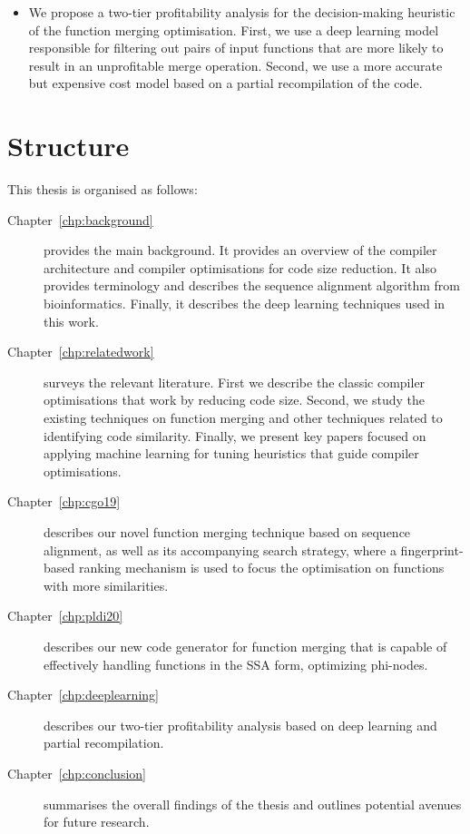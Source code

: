 \begin{itemize}
  \item
  We propose a two-tier profitability analysis for the decision-making heuristic of the function merging optimisation.
  First, we use a deep learning model responsible for filtering out pairs of input functions that are more likely to result in an unprofitable merge operation.
  Second, we use a more accurate but expensive cost model based on a partial recompilation of the code.
\end{itemize}

\section{Structure}

This thesis is organised as follows:
\begin{description}

\item[Chapter~\ref{chp:background}] provides the main background. It provides an overview of the compiler architecture and compiler optimisations for code size reduction.
It also provides terminology and describes the sequence alignment algorithm from bioinformatics.
Finally, it describes the deep learning techniques used in this work.

\item[Chapter~\ref{chp:relatedwork}] surveys the relevant literature. First we describe the classic compiler optimisations that work by reducing code size. Second, we study the existing techniques on function merging and other techniques related to identifying code similarity. Finally, we present key papers focused on applying machine learning for tuning heuristics that guide compiler optimisations.

\item[Chapter~\ref{chp:cgo19}] describes our novel function merging technique based on sequence alignment, as well as its accompanying search strategy, where a fingerprint-based ranking mechanism is used to focus the optimisation on functions with more similarities. %

\item[Chapter~\ref{chp:pldi20}] describes our new code generator for function merging that is capable of effectively handling functions in the SSA form, optimizing phi-nodes.

\item[Chapter~\ref{chp:deeplearning}] describes our two-tier profitability analysis based on deep learning and partial recompilation.

\item[Chapter~\ref{chp:conclusion}] summarises the overall findings of the thesis and outlines potential avenues for future research.

\end{description}
